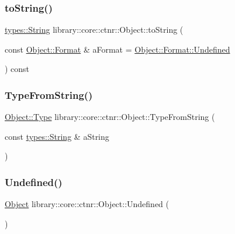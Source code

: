 \subsubsection{\texorpdfstring{toString()}{toString()}}
{\footnotesize\ttfamily \mbox{\hyperlink{classlibrary_1_1core_1_1types_1_1_string}{types\+::\+String}} library\+::core\+::ctnr\+::\+Object\+::to\+String (\begin{DoxyParamCaption}\item[{const \mbox{\hyperlink{classlibrary_1_1core_1_1ctnr_1_1_object_a7bf8961c4ef65f691aa2993ec405c647}{Object\+::\+Format}} \&}]{a\+Format = {\ttfamily \mbox{\hyperlink{classlibrary_1_1core_1_1ctnr_1_1_object_a7bf8961c4ef65f691aa2993ec405c647aec0fc0100c4fc1ce4eea230c3dc10360}{Object\+::\+Format\+::\+Undefined}}} }\end{DoxyParamCaption}) const}

\mbox{\label{classlibrary_1_1core_1_1ctnr_1_1_object_a24126bc23a9ab818f3e64fc330c52fcc}} 
\subsubsection{\texorpdfstring{TypeFromString()}{TypeFromString()}}
{\footnotesize\ttfamily \mbox{\hyperlink{classlibrary_1_1core_1_1ctnr_1_1_object_a0766006ad111133d70349019551b31d6}{Object\+::\+Type}} library\+::core\+::ctnr\+::\+Object\+::\+Type\+From\+String (\begin{DoxyParamCaption}\item[{const \mbox{\hyperlink{classlibrary_1_1core_1_1types_1_1_string}{types\+::\+String}} \&}]{a\+String }\end{DoxyParamCaption})\hspace{0.3cm}{\ttfamily [static]}}

\mbox{\label{classlibrary_1_1core_1_1ctnr_1_1_object_a9b222d8bf5599b6f2a658bda003f6f06}} 
\subsubsection{\texorpdfstring{Undefined()}{Undefined()}}
{\footnotesize\ttfamily \mbox{\hyperlink{classlibrary_1_1core_1_1ctnr_1_1_object}{Object}} library\+::core\+::ctnr\+::\+Object\+::\+Undefined (\begin{DoxyParamCaption}{ }\end{DoxyParamCaption})\hspace{0.3cm}{\ttfamily [static]}}



